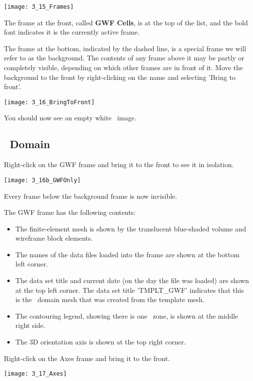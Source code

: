         \texttt{[image: 3\_15\_Frames]}

The frame at the front, called \textbf{GWF Cells}, is at the top of the list, and the bold font indicates it is the currently active frame.

The frame at the bottom, indicated by the dashed line, is a special frame we will refer to as the {\sf background}.  The contents of any frame above it may be partly or completely visible, depending on which other frames are in front of it.  Move the {\sf background} to the front by right-clicking on the name and selecting 'Bring to front'.

        \texttt{[image: 3\_16\_BringToFront]}

You should now see an empty white \tecplot\ image.

\subsection{\gwf\ Domain}
Right-click on the {\sf GWF} frame and bring it to the front to see it in isolation.

        \texttt{[image: 3\_16b\_GWFOnly]}

Every frame below the {\sf background} frame is now invisible.

The {\sf GWF} frame has the following contents:
\begin{itemize}
  \item The finite-element mesh is shown by the translucent blue-shaded volume and wireframe block elements.
  \item The names of the data files loaded into the frame are shown at the bottom left corner.
  \item The data set title and current date (on the day the file was loaded) are shown at the top left corner.  The data set title 'TMPLT\_GWF' indicates that this is the \gwf\ domain mesh that was created from the template mesh.
  \item The contouring legend, showing there is one \gwf\ zone, is shown at the middle right side.
  \item The 3D orientation axis is shown at the top right corner.
\end{itemize}

Right-click on the {\sf Axes} frame and bring it to the front.

        \texttt{[image: 3\_17\_Axes]}

